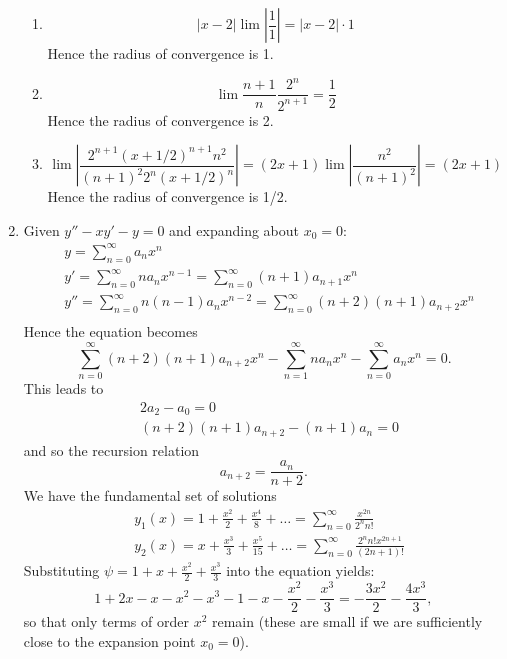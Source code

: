 \documentclass[a4paper,12pt,leqno]{article}
\begin{document}
\begin{enumerate}
\begin{enumerate}
\item \[ |x-2| \lim|\frac{1}{1}| = |x-2|\cdot 1 \] Hence the radius of convergence is 1.
\item \[ \lim \frac{n+1}{n} \frac{2^n}{2^{n+1}} = \frac{1}{2} \] Hence the radius of convergence is 2.
\item \[ \lim | \frac{2^{n+1} (x+1/2)^{n+1} n^2}{(n+1)^2 2^n (x+1/2)^n}| = (2x+1) \lim |\frac{n^2}{(n+1)^2}| = (2x+1) \] Hence the radius of convergence is 1/2.
\end{enumerate}
\item Given $y'' - xy' - y = 0$ and expanding about $x_0 = 0$:
\begin{align*}
&y = \sum_{n=0}^\infty a_n x^n \\
&y' = \sum_{n=0}^\infty n a_n x^{n-1} = \sum_{n=0}^\infty (n+1) a_{n+1} x^{n} \\
&y'' = \sum_{n=0}^\infty n(n-1) a_n x^{n-2} = \sum_{n=0}^\infty (n+2)(n+1) a_{n+2} x^{n} \\
\end{align*}
Hence the equation becomes 
\[ \sum_{n=0}^\infty (n+2)(n+1) a_{n+2} x^{n} - \sum_{n=1}^\infty n a_n x^{n} - \sum_{n=0}^\infty a_n x^n = 0. \]
This leads to 
\begin{align*}
& 2a_2 - a_0 = 0 \\
& (n+2)(n+1)a_{n+2} - (n+1)a_n = 0 
\end{align*}
and so the recursion relation 
\[ a_{n+2} = \frac{a_n}{n+2}. \]
We have the fundamental set of solutions 
\begin{align*}
& y_1(x) = 1 + \frac{x^2}{2} + \frac{x^4}{8} + \ldots = \sum_{n=0}^\infty \frac{x^{2n}}{2^n n!} \\
& y_2(x) = x + \frac{x^3}{3} + \frac{x^5}{15} + \ldots = \sum_{n=0}^\infty \frac{2^n n! x^{2n+1}}{(2n+1)!}
\end{align*}
Substituting $\psi = 1 + x + \frac{x^2}{2} + \frac{x^3}{3}$ into the equation yields:
\[ 1 + 2x - x -x^2 - x^3 - 1 - x - \frac{x^2}{2} - \frac{x^3}{3} = -\frac{3x^2}{2} - \frac{4x^3}{3},\]
so that only terms of order $x^2$ remain (these are small if we are sufficiently close to the expansion point $x_0 = 0$).
\end{enumerate}
\end{document}
